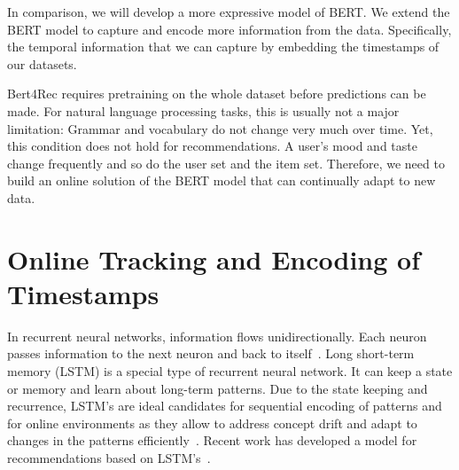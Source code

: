 In comparison, we will develop a more expressive model of BERT. We extend the BERT model to capture and encode more information from the data. Specifically, the temporal information that we can capture by embedding the timestamps of our datasets.

Bert4Rec requires pretraining on the whole dataset before predictions can be made. For natural language processing tasks, this is usually not a major limitation: Grammar and vocabulary do not change very much over time. Yet, this condition does not hold for recommendations. A user's mood and taste change frequently and so do the user set and the item set. Therefore, we need to build an online solution of the BERT model that can continually adapt to new data.


% 

\section{Online Tracking and Encoding of Timestamps}
In recurrent neural networks, information flows unidirectionally. Each neuron passes information to the next neuron and back to itself~\cite{geron2019hands}. Long short-term memory (LSTM) is a special type of recurrent neural network. It can keep a state or memory and learn about long-term patterns. Due to the state keeping and recurrence, LSTM's are ideal candidates for sequential encoding of patterns and for online environments as they allow to address concept drift and adapt to changes in the patterns efficiently~\cite{ergen2017efficient}. Recent work has developed a model for recommendations based on LSTM's~\cite{kang2018self}.
% 

